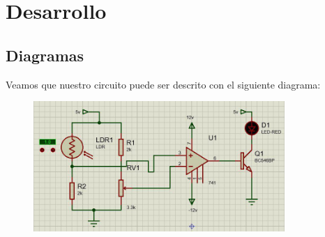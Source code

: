\documentclass[12pt, fleqn]{article}                            %
\theoremstyle{break}                                            %
\begin{document}
\clearpage
\section{Desarrollo}


    \subsection{Diagramas}

        Veamos que nuestro circuito puede ser descrito con el siguiente diagrama:
        \begin{figure}[h]
            \centering
            \includegraphics[width=0.85\textwidth]{CircuitoGeneral}
        \end{figure}
\end{document}
